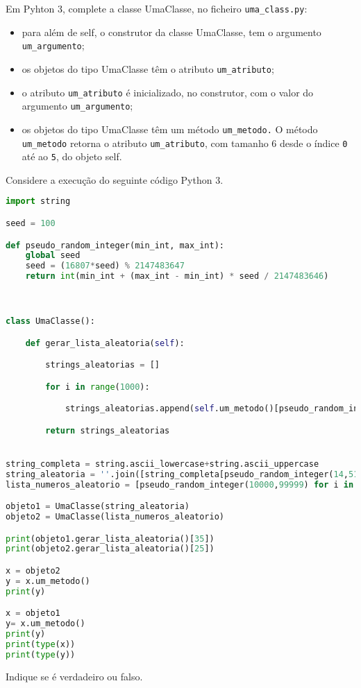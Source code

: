 \documentclass[12pt,varwidth=16cm,border=17pt]{standalone}
\begin{document}
Em Pyhton 3, complete a classe UmaClasse, no ficheiro \verb+uma_class.py+:

\begin{itemize}
  \item para além de self, o construtor da classe UmaClasse, tem o argumento \verb+um_argumento+;
  \item os objetos do tipo UmaClasse têm o atributo \verb+um_atributo+;
  \item o atributo \verb+um_atributo+ é inicializado, no construtor, com o valor
do argumento \verb+um_argumento+;
  \item os objetos do tipo UmaClasse têm um método \verb+um_metodo.+ O
    método \verb+um_metodo+ retorna o atributo \verb+um_atributo+, com tamanho 6 desde o índice \verb+0+ até ao \verb+5+, do objeto self.
\end{itemize}

Considere a execução do seguinte código Python 3.



\begin{lstlisting}[language=Python]
import string

seed = 100

def pseudo_random_integer(min_int, max_int):
    global seed
    seed = (16807*seed) % 2147483647
    return int(min_int + (max_int - min_int) * seed / 2147483646)



class UmaClasse():

	def gerar_lista_aleatoria(self):

		strings_aleatorias = []

		for i in range(1000):

			strings_aleatorias.append(self.um_metodo()[pseudo_random_integer(0, 5)])

		return strings_aleatorias


string_completa = string.ascii_lowercase+string.ascii_uppercase
string_aleatoria = ''.join([string_completa[pseudo_random_integer(14,51)] for i in range(1000)])
lista_numeros_aleatorio = [pseudo_random_integer(10000,99999) for i in range(1000)]

objeto1 = UmaClasse(string_aleatoria)
objeto2 = UmaClasse(lista_numeros_aleatorio)

print(objeto1.gerar_lista_aleatoria()[35])
print(objeto2.gerar_lista_aleatoria()[25])

x = objeto2
y = x.um_metodo()
print(y)

x = objeto1
y= x.um_metodo()
print(y)
print(type(x))
print(type(y))
\end{lstlisting}

Indique se é verdadeiro ou falso.
\end{document}
